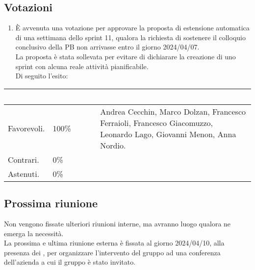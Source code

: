 \subsection{Votazioni} \label{subsec:resvotazione}
\begin{enumerate}
    \item È avvenuta una votazione per approvare la proposta di estensione automatica di una settimana dello sprint 11, qualora la richiesta di sostenere il colloquio conclusivo della PB non arrivasse entro il giorno 2024/04/07.\\
    La proposta è stata sollevata per evitare di dichiarare la creazione di uno sprint con alcuna reale attività pianificabile.\\
    Di seguito l'esito:
\end{enumerate}
\begingroup
    \setlength{\tabcolsep}{10pt}
    \renewcommand{\arraystretch}{1.5}
    \begin{tabularx}{\textwidth}{| l | l | X |}
         \hline
         \rowcolor{headerrow}\textbf{\textcolor{white}{Proposta}} & \textbf{\textcolor{white}{Sommario}} & \textbf{\textcolor{white}{Mittente}} \\
         \hline
         Favorevoli. & 100\%  & Andrea Cecchin, Marco Dolzan, Francesco Ferraioli, Francesco Giacomuzzo, Leonardo Lago, Giovanni Menon, Anna Nordio.\\
         \hline
         Contrari. & 0\% &  \\
         \hline
         Astenuti. & 0\% &  \\
         \hline
    \end{tabularx}
\endgroup

\subsection{Prossima riunione} \label{subsec:riunione}


Non vengono fissate ulteriori riunioni interne, ma avranno luogo qualora ne emerga la necessità.\\
La prossima e ultima riunione esterna è fissata al giorno 2024/04/10, alla presenza dei , per organizzare l'intervento del gruppo ad una conferenza dell'azienda a cui il gruppo è stato invitato.
